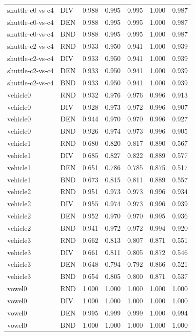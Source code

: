 \documentclass[10pt,a4paper]{article}
\begin{document}
\begin{longtable}{lllllrr}
shuttle-c0-vs-c4 & DIV & 0.988 & 0.995 & 0.995 & 1.000 & 0.987 \\
shuttle-c0-vs-c4 & DEN & 0.988 & 0.995 & 0.995 & 1.000 & 0.987 \\
shuttle-c0-vs-c4 & BND & 0.988 & 0.995 & 0.995 & 1.000 & 0.987 \\
shuttle-c2-vs-c4 & RND & 0.933 & 0.950 & 0.941 & 1.000 & 0.939 \\
shuttle-c2-vs-c4 & DIV & 0.933 & 0.950 & 0.941 & 1.000 & 0.939 \\
shuttle-c2-vs-c4 & DEN & 0.933 & 0.950 & 0.941 & 1.000 & 0.939 \\
shuttle-c2-vs-c4 & BND & 0.933 & 0.950 & 0.941 & 1.000 & 0.939 \\
vehicle0 & RND & 0.932 & 0.976 & 0.976 & 0.996 & 0.913 \\
vehicle0 & DIV & 0.928 & 0.973 & 0.972 & 0.996 & 0.907 \\
vehicle0 & DEN & 0.944 & 0.970 & 0.970 & 0.996 & 0.927 \\
vehicle0 & BND & 0.926 & 0.974 & 0.973 & 0.996 & 0.905 \\
vehicle1 & RND & 0.680 & 0.820 & 0.817 & 0.890 & 0.567 \\
vehicle1 & DIV & 0.685 & 0.827 & 0.822 & 0.889 & 0.577 \\
vehicle1 & DEN & 0.651 & 0.786 & 0.785 & 0.875 & 0.517 \\
vehicle1 & BND & 0.673 & 0.815 & 0.811 & 0.889 & 0.557 \\
vehicle2 & RND & 0.951 & 0.973 & 0.973 & 0.996 & 0.934 \\
vehicle2 & DIV & 0.955 & 0.974 & 0.973 & 0.996 & 0.939 \\
vehicle2 & DEN & 0.952 & 0.970 & 0.970 & 0.995 & 0.936 \\
vehicle2 & BND & 0.941 & 0.972 & 0.972 & 0.994 & 0.920 \\
vehicle3 & RND & 0.662 & 0.813 & 0.807 & 0.871 & 0.551 \\
vehicle3 & DIV & 0.661 & 0.811 & 0.805 & 0.872 & 0.546 \\
vehicle3 & DEN & 0.648 & 0.794 & 0.792 & 0.866 & 0.521 \\
vehicle3 & BND & 0.654 & 0.805 & 0.800 & 0.871 & 0.537 \\
vowel0 & RND & 1.000 & 1.000 & 1.000 & 1.000 & 1.000 \\
vowel0 & DIV & 1.000 & 1.000 & 1.000 & 1.000 & 1.000 \\
vowel0 & DEN & 0.995 & 0.999 & 0.999 & 1.000 & 0.994 \\
vowel0 & BND & 1.000 & 1.000 & 1.000 & 1.000 & 1.000 \\

\end{longtable}
\end{document}
